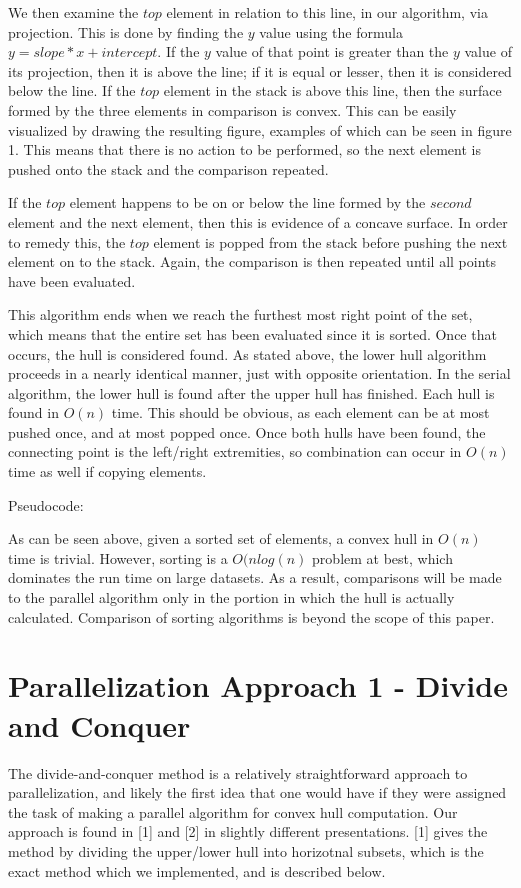 \documentclass[conference]{IEEEtran}
\begin{document}
We then examine the $top$ element in relation to this line, in our algorithm, via projection. This is done by finding the $y$ value using the formula $y = slope * x + intercept$. If the $y$ value of that point is greater than the $y$ value of its projection, then it is above the line; if it is equal or lesser, then it is considered below the line. If the $top$ element in the stack is above this line, then the surface formed by the three elements in comparison is convex. This can be easily visualized by drawing the resulting figure, examples of which can be seen in figure 1. This means that there is no action to be performed, so the next element is pushed onto the stack and the comparison repeated.

If the $top$ element happens to be on or below the line formed by the $second$ element and the next element, then this is evidence of a concave surface. In order to remedy this, the $top$ element is popped from the stack before pushing the next element on to the stack. Again, the comparison is then repeated until all points have been evaluated.

This algorithm ends when we reach the furthest most right point of the set, which means that the entire set has been evaluated since it is sorted. Once that occurs, the hull is considered found. As stated above, the lower hull algorithm proceeds in a nearly identical manner, just with opposite orientation. In the serial algorithm, the lower hull is found after the upper hull has finished. Each hull is found in $O(n)$ time. This should be obvious, as each element can be at most pushed once, and at most popped once. Once both hulls have been found, the connecting point is the left/right extremities, so combination can occur in $O(n)$ time as well if copying elements.

Pseudocode:

As can be seen above, given a sorted set of elements, a convex hull in $O(n)$ time is trivial. However, sorting is a $O(nlog(n)$ problem at best, which dominates the run time on large datasets. As a result, comparisons will be made to the parallel algorithm only in the portion in which the hull is actually calculated. Comparison of sorting algorithms is beyond the scope of this paper.

\section{Parallelization Approach 1 - Divide and Conquer}
The divide-and-conquer method is a relatively straightforward approach to parallelization, and likely the first idea that one would have if they were assigned the task of making a parallel algorithm for convex hull computation. Our approach is found in [1] and [2] in slightly different presentations. [1] gives the method by dividing the upper/lower hull into horizotnal subsets, which is the exact method which we implemented, and is described below. 
\end{document}
